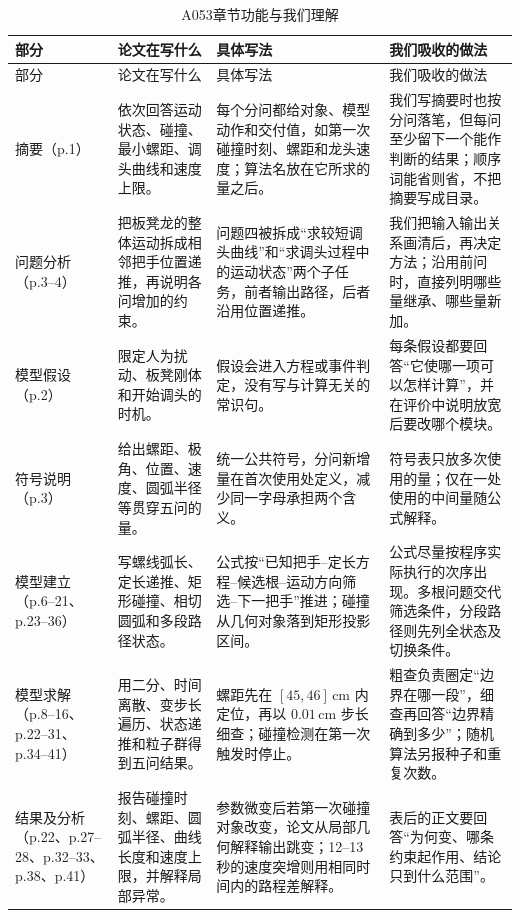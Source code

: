 \documentclass[UTF8,zihao=-4]{ctexart}
\begin{document}
\small
\begin{longtable}{p{2.25cm}p{4.0cm}p{5.1cm}p{4.2cm}}
\caption{A053章节功能与我们理解}\label{tab:a053-structure}\\
\toprule
部分 & 论文在写什么 & 具体写法 & 我们吸收的做法\\
\midrule
\endfirsthead
\toprule
部分 & 论文在写什么 & 具体写法 & 我们吸收的做法\\
\midrule
\endhead
\bottomrule
\endfoot
摘要（p.1）
& 依次回答运动状态、碰撞、最小螺距、调头曲线和速度上限。
& 每个分问都给对象、模型动作和交付值，如第一次碰撞时刻、螺距和龙头速度；算法名放在它所求的量之后。
& 我们写摘要时也按分问落笔，但每问至少留下一个能作判断的结果；顺序词能省则省，不把摘要写成目录。\\

问题分析（p.3--4）
& 把板凳龙的整体运动拆成相邻把手位置递推，再说明各问增加的约束。
& 问题四被拆成“求较短调头曲线”和“求调头过程中的运动状态”两个子任务，前者输出路径，后者沿用位置递推。
& 我们把输入输出关系画清后，再决定方法；沿用前问时，直接列明哪些量继承、哪些量新加。\\

模型假设（p.2）
& 限定人为扰动、板凳刚体和开始调头的时机。
& 假设会进入方程或事件判定，没有写与计算无关的常识句。
& 每条假设都要回答“它使哪一项可以怎样计算”，并在评价中说明放宽后要改哪个模块。\\

符号说明（p.3）
& 给出螺距、极角、位置、速度、圆弧半径等贯穿五问的量。
& 统一公共符号，分问新增量在首次使用处定义，减少同一字母承担两个含义。
& 符号表只放多次使用的量；仅在一处使用的中间量随公式解释。\\

模型建立（p.6--21、p.23--36）
& 写螺线弧长、定长递推、矩形碰撞、相切圆弧和多段路径状态。
& 公式按“已知把手--定长方程--候选根--运动方向筛选--下一把手”推进；碰撞从几何对象落到矩形投影区间。
& 公式尽量按程序实际执行的次序出现。多根问题交代筛选条件，分段路径则先列全状态及切换条件。\\

模型求解（p.8--16、p.22--31、p.34--41）
& 用二分、时间离散、变步长遍历、状态递推和粒子群得到五问结果。
& 螺距先在 $[45,46]\,\mathrm{cm}$ 内定位，再以 $0.01\,\mathrm{cm}$ 步长细查；碰撞检测在第一次触发时停止。
& 粗查负责圈定“边界在哪一段”，细查再回答“边界精确到多少”；随机算法另报种子和重复次数。\\

结果及分析（p.22、p.27--28、p.32--33、p.38、p.41）
& 报告碰撞时刻、螺距、圆弧半径、曲线长度和速度上限，并解释局部异常。
& 参数微变后若第一次碰撞对象改变，论文从局部几何解释输出跳变；12--13秒的速度突增则用相同时间内的路程差解释。
& 表后的正文要回答“为何变、哪条约束起作用、结论只到什么范围”。\\


\end{longtable}
\end{document}
